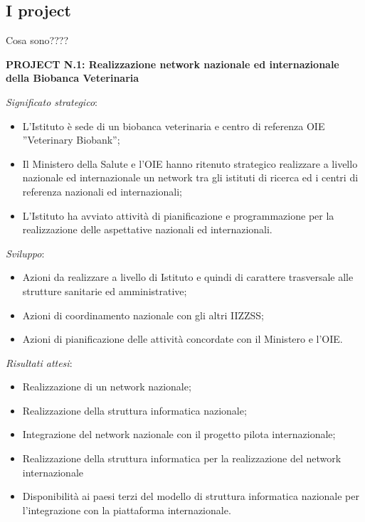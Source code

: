 \documentclass[
  12pt,
]{article}
\providecommand{\tightlist}{%
  \setlength{\itemsep}{0pt}\setlength{\parskip}{0pt}}
\begin{document}
\hypertarget{i-project}{%
\subsection{I project}\label{i-project}}

Cosa sono????

\textbf{PROJECT N.1: Realizzazione network nazionale ed internazionale
della Biobanca Veterinaria}

\emph{Significato strategico}:

\begin{itemize}
\tightlist
\item
  L'Istituto è sede di un biobanca veterinaria e centro di referenza OIE
  ''Veterinary Biobank'';
\item
  Il Ministero della Salute e l'OIE hanno ritenuto strategico realizzare
  a livello nazionale ed internazionale un network tra gli istituti di
  ricerca ed i centri di referenza nazionali ed internazionali;
\item
  L'Istituto ha avviato attività di pianificazione e programmazione per
  la realizzazione delle aspettative nazionali ed internazionali.
\end{itemize}

\emph{Sviluppo}:

\begin{itemize}
\tightlist
\item
  Azioni da realizzare a livello di Istituto e quindi di carattere
  trasversale alle strutture sanitarie ed amministrative;
\item
  Azioni di coordinamento nazionale con gli altri IIZZSS;
\item
  Azioni di pianificazione delle attività concordate con il Ministero e
  l'OIE.
\end{itemize}

\emph{Risultati attesi}:

\begin{itemize}
\tightlist
\item
  Realizzazione di un network nazionale;
\item
  Realizzazione della struttura informatica nazionale;
\item
  Integrazione del network nazionale con il progetto pilota
  internazionale;
\item
  Realizzazione della struttura informatica per la realizzazione del
  network internazionale
\item
  Disponibilità ai paesi terzi del modello di struttura informatica
  nazionale per l'integrazione con la piattaforma internazionale.
\end{itemize}
\end{document}

